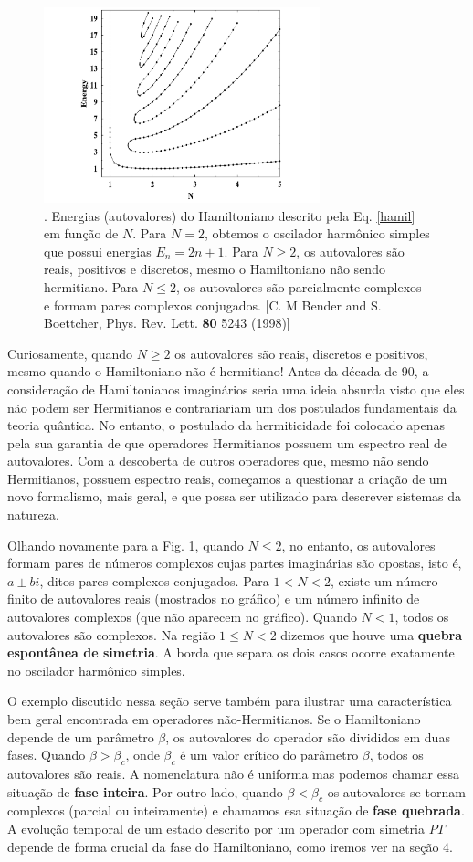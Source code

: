 \documentclass{article}
\begin{document}
\begin{figure}[h]
\centering
\includegraphics[width=8cm]{fig1.pdf}
\captionsetup{labelsep=none}
\caption{. Energias (autovalores) do Hamiltoniano descrito pela Eq. \eqref{hamil} em função de $N$. Para $N = 2$, obtemos o oscilador harmônico simples que possui energias $E_n = 2n + 1$. Para $N \geq 2$, os autovalores são reais, positivos e discretos, mesmo o Hamiltoniano não sendo hermitiano. Para $N\leq 2$, os autovalores são parcialmente complexos e formam pares complexos conjugados. [C. M Bender and S. Boettcher, Phys. Rev. Lett. \textbf{80} 5243 (1998)] }
\end{figure}
Curiosamente, quando $N\geq 2$ os autovalores são reais, discretos e positivos, mesmo quando o Hamiltoniano não é hermitiano! Antes da década de 90, a consideração de Hamiltonianos imaginários seria uma ideia absurda visto que eles não podem ser Hermitianos e contrariariam um dos postulados fundamentais da teoria quântica. No entanto, o postulado da hermiticidade foi colocado apenas pela sua garantia de que operadores Hermitianos possuem um espectro real de autovalores. Com a descoberta de outros operadores que, mesmo não sendo Hermitianos, possuem espectro reais, começamos a questionar a criação de um novo formalismo, mais geral, e que possa ser utilizado para descrever sistemas da natureza.

Olhando novamente para a Fig. 1, quando $N \leq 2$, no entanto, os autovalores formam pares de números complexos cujas partes imaginárias são opostas, isto é, $a \pm bi$, ditos pares complexos conjugados. Para $1 < N < 2$, existe um número finito de autovalores reais (mostrados no gráfico) e um número infinito de autovalores complexos (que não aparecem no gráfico). Quando $N < 1$, todos os autovalores são complexos. Na região $1 \leq N < 2$ dizemos que houve uma \textbf{quebra espontânea de simetria}. A borda que separa os dois casos ocorre exatamente no oscilador harmônico simples.

O exemplo discutido nessa seção serve também para ilustrar uma característica bem geral encontrada em operadores não-Hermitianos. Se o Hamiltoniano depende de um parâmetro $\beta$, os autovalores do operador são divididos em duas fases. Quando $\beta > \beta_c$, onde $\beta_c$ é um valor crítico do parâmetro $\beta$, todos os autovalores são reais. A nomenclatura não é uniforma mas podemos chamar essa situação de \textbf{fase inteira}. Por outro lado, quando $\beta < \beta_c$ os autovalores se tornam complexos (parcial ou inteiramente) e chamamos esa situação de \textbf{fase quebrada}. A evolução temporal de um estado descrito por um operador com simetria $PT$ depende de forma crucial da fase do Hamiltoniano, como iremos ver na seção 4.
\end{document}

